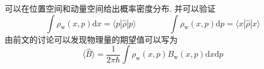         可以在位置空间和动量空间给出概率密度分布. 并可以验证
        \begin{equation}
            \int \rho_\mathrm{w}(x,p) \mathrm{d}x = \langle p|\hat{\rho}|p \rangle
            \qquad\qquad
            \int \rho_\mathrm{w}(x,p) \mathrm{d}p = \langle x|\hat{\rho}|x \rangle
        \end{equation}
        由前文的讨论可以发现物理量的期望值可以写为
        \begin{equation}
            \langle \hat{B} \rangle = \frac 1{2\pi \hbar} \int \rho_\mathrm{w}(x,p) B_\mathrm{w}(x,p) \mathrm{d}x\mathrm{d}p
        \end{equation}

    
    